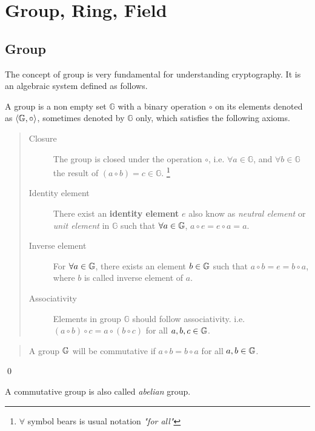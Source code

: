 \section{Group, Ring, Field}
\label{sec:chap:fund:group}
\subsection{Group}
The concept of group  is very fundamental for understanding cryptography. It is an algebraic system defined as follows.
\begin{definition}
A group  is a non empty set $\mathbb{G}$ with a binary operation $\circ$ on its elements denoted as  $\langle\mathbb{G}\index{group},\circ\rangle$,  sometimes denoted by   $\mathbb{G}$ only, which satisfies the following axioms.
\begin{quote}
	\begin{description}
		\item[Closure] The group is closed under the operation $\circ$, i.e.  $\forall a \in\mathbb{G}$, and $\forall b \in\mathbb{G}$ the result of $ (a\circ b) = c \in \mathbb{G}$. \footnote{$\forall$ symbol bears is usual notation \textit{"for all"} }
		
		\item[Identity element] There exist an \textbf{identity element } $e$ also know as \textit{neutral element} or \textit{unit element} in $\mathbb{G}$ such that $\forall a \in\mathbb{G} \index{group}$,  $a\circ e = e\circ a = a$.
		
		\item[Inverse element] For ${\forall}a \in\mathbb{G}\index{group}$, there exists an element $b\in\mathbb{G}\index{group}$ such that $a\circ b=e=b\circ a$, where $b$ is called inverse element of $a$.
		
		\item[Associativity] Elements in  group $\mathbb{G}$ should follow associativity. i.e. $(a\circ b)\circ c=a\circ (b\circ c)$ for all $ a,b,c\in\mathbb{G}\index{group}$.
		
\end{description}
\end{quote}
\end{definition}

\begin{definition} \hspace{0em}
\begin{quote}\begin{description}
A group  $\mathbb{G}\index{group}$ will be commutative if $a\circ b=b\circ a$ for all $a,b \in\mathbb{G}\index{group}$.
\end{description}\end{quote}
\qed
\end{definition}
A commutative group is also called \textit{abelian} group.

